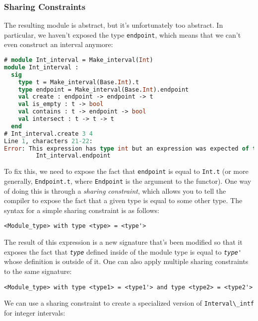 \hypertarget{sharing-constraints}{%
\subsubsection{Sharing Constraints}\label{sharing-constraints}}

The resulting module is abstract, but it's unfortunately too abstract.
In particular, we haven't exposed the type
\passthrough{\lstinline!endpoint!}, which means that we can't even
construct an interval anymore: 

\begin{lstlisting}[language=Caml]
# module Int_interval = Make_interval(Int)
module Int_interval :
  sig
    type t = Make_interval(Base.Int).t
    type endpoint = Make_interval(Base.Int).endpoint
    val create : endpoint -> endpoint -> t
    val is_empty : t -> bool
    val contains : t -> endpoint -> bool
    val intersect : t -> t -> t
  end
# Int_interval.create 3 4
Line 1, characters 21-22:
Error: This expression has type int but an expression was expected of type
         Int_interval.endpoint
\end{lstlisting}

To fix this, we need to expose the fact that
\passthrough{\lstinline!endpoint!} is equal to
\passthrough{\lstinline!Int.t!} (or more generally,
\passthrough{\lstinline!Endpoint.t!}, where
\passthrough{\lstinline!Endpoint!} is the argument to the functor). One
way of doing this is through a \emph{sharing constraint}, which allows
you to tell the compiler to expose the fact that a given type is equal
to some other type. The syntax for a simple sharing constraint is as
follows:

\begin{lstlisting}
<Module_type> with type <type> = <type'>
\end{lstlisting}

The result of this expression is a new signature that's been modified so
that it exposes the fact that \emph{\passthrough{\lstinline!type!}}
defined inside of the module type is equal to
\emph{\passthrough{\lstinline!type'!}} whose definition is outside of
it. One can also apply multiple sharing constraints to the same
signature:

\begin{lstlisting}
<Module_type> with type <type1> = <type1'> and type <type2> = <type2'>
\end{lstlisting}

We can use a sharing constraint to create a specialized version of
\passthrough{\lstinline!Interval\_intf!} for integer intervals:

